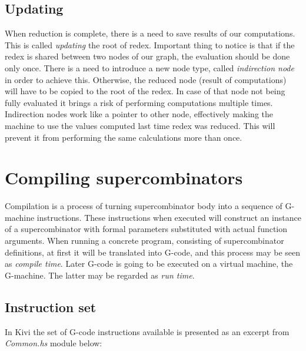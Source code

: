 \documentclass[12pt,a4paper]{report}
\begin{document}
\subsection{Updating}
\label{sec:updating}
When reduction is complete, there is a need to save results of our
computations. This is called \textit{updating} the root of redex. Important
thing to notice is that if the redex is shared between two nodes of our graph,
the evaluation should be done only once. There is a need to introduce a new
node type, called \textit{indirection node} in order to achieve this.
Otherwise, the reduced node (result of computations) will have to be copied to
the root of the redex. In case of that node not being fully evaluated it brings
a risk of performing computations multiple times. Indirection nodes work like a
pointer to other node, effectively making the machine to use the values
computed last time redex was reduced. This will prevent it from performing the
same calculations more than once.

%
%
%

\section{Compiling supercombinators}
Compilation is a process of turning supercombinator body into a sequence of
G-machine instructions. These instructions when executed will construct an
instance of a supercombinator with formal parameters substituted with actual
function arguments. When running a concrete program, consisting of
supercombinator definitions, at first it will be translated into G-code, and this
process may be seen as \textit{compile time}. Later G-code is going to be
executed on a virtual machine, the G-machine. The latter may be regarded as
\textit{run time}.


\subsection{Instruction set}
In Kivi the set of G-code instructions available is presented as an excerpt
from \textit{Common.hs} module below:
\end{document}
